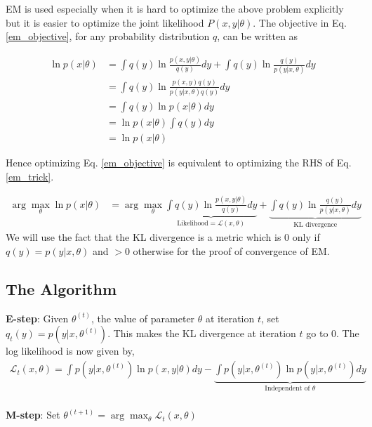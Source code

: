 \documentclass{article}[11pt]
\begin{document}
EM is used especially when it is hard to optimize the above problem explicitly but it is easier to optimize the joint likelihood $P(x,y|\theta)$. The objective in Eq. \ref{em_objective}, for any probability distribution $q$, can be written as 

\begin{align}
\label{em_trick}
\ln p(x|\theta) &= \int q(y)\ln\frac{p(x,y | \theta)}{q(y)} dy + \int q(y) \ln\frac{q(y)}{p(y|x,\theta)}dy \\
&= \int q(y) \ln \frac{p(x,y)q(y)}{p(y|x,\theta)q(y)}dy\\
&= \int q(y) \ln  p(x|\theta) dy \\
&= \ln  p(x|\theta) \int q(y)dy \\
&= \ln  p(x|\theta)
\end{align}

Hence optimizing Eq. \ref{em_objective} is equivalent to optimizing the RHS of Eq. \ref{em_trick}. 

\begin{align}
\arg \max_\theta \ln p(x|\theta) &= \arg \max_\theta \underbrace{\int q(y)\ln\frac{p(x,y | \theta)}{q(y)} dy }_{\text{Likelihood} = \mathcal{L}(x,\theta)}+ \underbrace{\int q(y) \ln\frac{q(y)}{p(y|x,\theta)}dy}_{\text{KL divergence}}
\end{align} We will use the fact that the KL divergence is a metric which is $0$ only if $q(y) = p(y | x,\theta)$ and $>0$ otherwise for the proof of convergence of EM.

\subsection{The Algorithm}
\textbf{E-step}: Given $\theta^{(t)}$, the value of parameter $\theta$ at iteration $t$,  set $q_t(y) = p(y|x, \theta^{(t)})$. This makes the KL divergence at iteration $t$ go to $0$. The log likelihood is now given by,
\begin{align}
\label{expectation}
\mathcal{L}_t(x,\theta) = \int p(y|x, \theta^{(t)}) \ln p(x,y|\theta) dy - \underbrace{\int p(y|x, \theta^{(t)}) \ln p(y|x, \theta^{(t)}) dy}_{\text{Independent of } \theta}
\end{align}\\
\textbf{M-step}: Set $\theta^{(t+1)} = \arg \max_{\theta} \mathcal{L}_t(x,\theta)$
\end{document}

